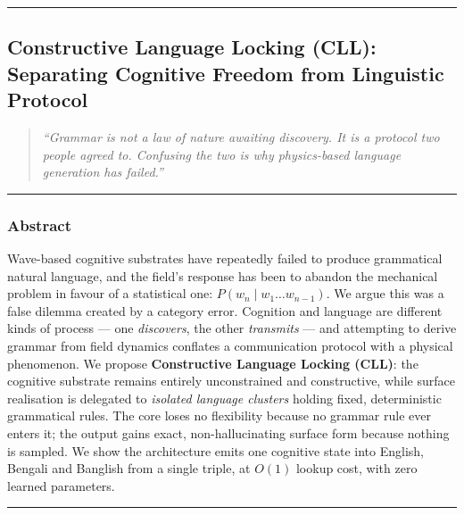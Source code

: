 \documentclass[
  11pt,
  a4paper,
]{article}
\begin{document}
\begin{center}\rule{0.5\linewidth}{0.5pt}\end{center}

\newpage

\subsection{Constructive Language Locking (CLL): Separating Cognitive
Freedom from Linguistic
Protocol}\label{constructive-language-locking-cll-separating-cognitive-freedom-from-linguistic-protocol}

\begin{quote}
\emph{``Grammar is not a law of nature awaiting discovery. It is a
protocol two people agreed to. Confusing the two is why physics-based
language generation has failed.''}
\end{quote}

\begin{center}\rule{0.5\linewidth}{0.5pt}\end{center}

\subsubsection{Abstract}\label{abstract}

Wave-based cognitive substrates have repeatedly failed to produce
grammatical natural language, and the field's response has been to
abandon the mechanical problem in favour of a statistical one:
\(P(w_n \mid w_1 \ldots w_{n-1})\). We argue this was a false dilemma
created by a category error. Cognition and language are different kinds
of process --- one \emph{discovers}, the other \emph{transmits} --- and
attempting to derive grammar from field dynamics conflates a
communication protocol with a physical phenomenon. We propose
\textbf{Constructive Language Locking (CLL)}: the cognitive substrate
remains entirely unconstrained and constructive, while surface
realisation is delegated to \emph{isolated language clusters} holding
fixed, deterministic grammatical rules. The core loses no flexibility
because no grammar rule ever enters it; the output gains exact,
non-hallucinating surface form because nothing is sampled. We show the
architecture emits one cognitive state into English, Bengali and
Banglish from a single triple, at \(O(1)\) lookup cost, with zero
learned parameters.

\begin{center}\rule{0.5\linewidth}{0.5pt}\end{center}
\end{document}
